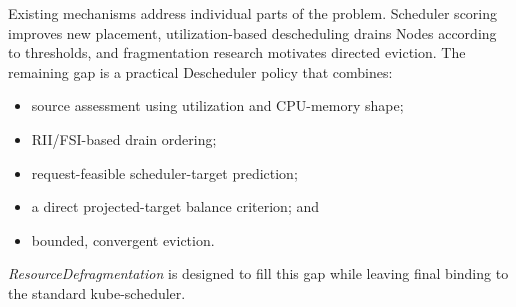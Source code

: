 Existing mechanisms address individual parts of the problem. Scheduler scoring improves new placement, utilization-based descheduling drains Nodes according to thresholds, and fragmentation research motivates directed eviction. The remaining gap is a practical Descheduler policy that combines:

\begin{itemize}
    \item source assessment using utilization and CPU-memory shape;
    \item RII/FSI-based drain ordering;
    \item request-feasible scheduler-target prediction;
    \item a direct projected-target balance criterion; and
    \item bounded, convergent eviction.
\end{itemize}

\textit{ResourceDefragmentation} is designed to fill this gap while leaving final binding to the standard kube-scheduler.
